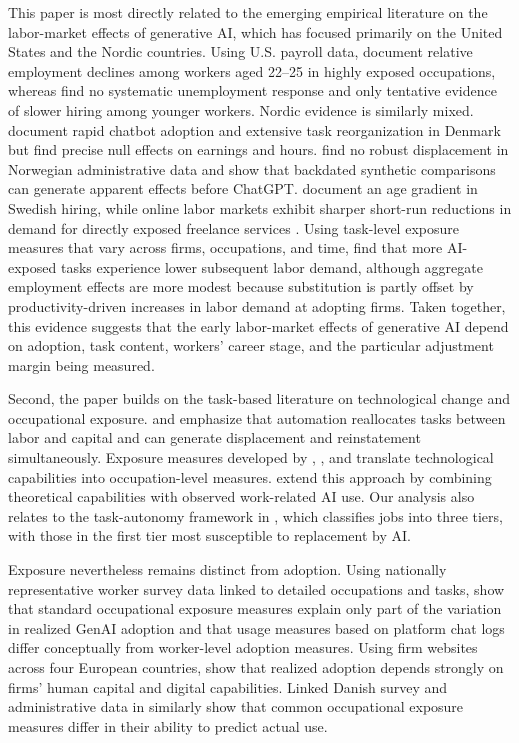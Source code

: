 This paper is most directly related to the emerging empirical literature on the labor-market effects of generative AI, which has focused primarily on the United States and the Nordic countries. Using U.S. payroll data, \citet{brynjolfsson_chandar_chen_2025} document relative employment declines among workers aged 22--25 in highly exposed occupations, whereas \citet{massenkoff_mccrory_2026} find no systematic unemployment response and only tentative evidence of slower hiring among younger workers. Nordic evidence is similarly mixed. \citet{humlum_vestergaard_2025} document rapid chatbot adoption and extensive task reorganization in Denmark but find precise null effects on earnings and hours. \citet{facius_iacono_2026} find no robust displacement in Norwegian administrative data and show that backdated synthetic comparisons can generate apparent effects before ChatGPT. \citet{lodefalk_et_al_2026} document an age gradient in Swedish hiring, while online labor markets exhibit sharper short-run reductions in demand for directly exposed freelance services \citep{hui_reshef_zhou_2024}. Using task-level exposure measures that vary across firms, occupations, and time, \citet{hampole_et_al_2025} find that more AI-exposed tasks experience lower subsequent labor demand, although aggregate employment effects are more modest because substitution is partly offset by productivity-driven increases in labor demand at adopting firms. Taken together, this evidence suggests that the early labor-market effects of generative AI depend on adoption, task content, workers' career stage, and the particular adjustment margin being measured.


Second, the paper builds on the task-based literature on technological change and occupational exposure. \citet{autor_levy_murnane_2003} and \citet{acemoglu_restrepo_2019} emphasize that automation reallocates tasks between labor and capital and can generate displacement and reinstatement simultaneously. Exposure measures developed by \citet{felten_raj_seamans_2021}, \citet{felten_raj_seamans_2023}, and \citet{eloundou_manning_mishkin_rock_2024} translate technological capabilities into occupation-level measures. \citet{massenkoff_mccrory_2026} extend this approach by combining theoretical capabilities with observed work-related AI use. Our analysis also relates to the task-autonomy framework in \citet{garicano2026messy}, which classifies jobs into three tiers, with those in the first tier most susceptible to replacement by AI.

Exposure nevertheless remains distinct from adoption. Using nationally representative worker survey data linked to detailed occupations and tasks, \citet{bick_et_al_2026} show that standard occupational exposure measures explain only part of the variation in realized GenAI adoption and that usage measures based on platform chat logs differ conceptually from worker-level adoption measures. Using firm websites across four European countries, \citet{garbers_gregory_2026} show that realized adoption depends strongly on firms' human capital and digital capabilities. Linked Danish survey and administrative data in \citet{pulito_et_al_2026} similarly show that common occupational exposure measures differ in their ability to predict actual use.


